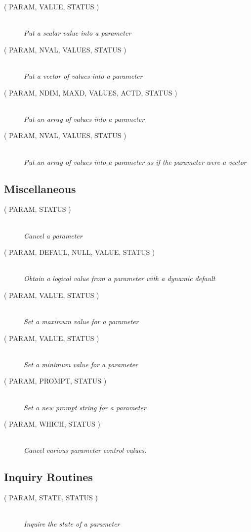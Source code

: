 \documentclass[twoside,11pt,nolof]{starlink}
\providecommand{\listline}{\hspace{1pt}\\}
\begin{document}
\begin{description}
\item [
( PARAM, VALUE, STATUS )] \listline
\textit{Put a scalar value into a parameter}
\item [
( PARAM, NVAL, VALUES, STATUS )] \listline
\textit{Put a vector of values into a parameter}
\item [
( PARAM, NDIM, MAXD, VALUES, ACTD, STATUS )] \listline
\textit{Put an array of values into a parameter}
\item [
( PARAM, NVAL, VALUES, STATUS )] \listline
\textit{Put an array of values into a parameter as if the parameter were a
            vector}
\end{description}

\subsection{Miscellaneous}

\begin{description}
\item [
( PARAM, STATUS )] \listline
\textit{Cancel a parameter}
\item [
( PARAM, DEFAUL, NULL, VALUE, STATUS )] \listline
\textit{Obtain a logical value from a parameter with a dynamic default}
\item [
( PARAM, VALUE, STATUS )] \listline
\textit{Set a maximum value for a parameter}
\item [
( PARAM, VALUE, STATUS )] \listline
\textit{Set a minimum value for a parameter}
\item [
( PARAM, PROMPT, STATUS )] \listline
\textit{Set a new prompt string for a parameter}
\item [
( PARAM, WHICH, STATUS )] \listline
\textit{Cancel various parameter control values.}
\end{description}

\subsection{Inquiry Routines}

\begin{description}
\item [
( PARAM, STATE, STATUS )] \listline
\textit{Inquire the state of a parameter}
\end{description}
\end{document}
